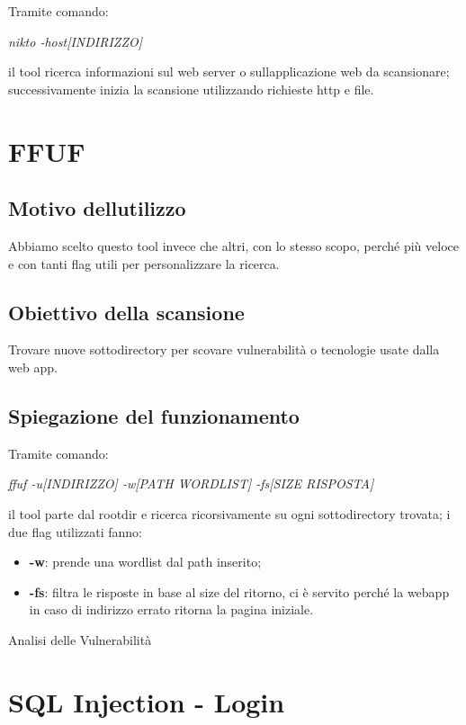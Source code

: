 Tramite comando:

\emph{nikto -host{[}INDIRIZZO{]}}

il tool ricerca informazioni sul web server o
sull\textquotesingle applicazione web da scansionare; successivamente
inizia la scansione utilizzando richieste http e file.

\section{FFUF}\label{ffuf}

\subsection{Motivo
dell\textquotesingle utilizzo}\label{motivo-dellutilizzo-6}

Abbiamo scelto questo tool invece che altri, con lo stesso scopo, perché
più veloce e con tanti flag utili per personalizzare la ricerca.

\subsection{Obiettivo della
scansione}\label{obiettivo-della-scansione-6}

Trovare nuove sottodirectory per scovare vulnerabilità o tecnologie
usate dalla web app.

\subsection{Spiegazione del
funzionamento}\label{spiegazione-del-funzionamento-6}

Tramite comando:

\emph{ffuf -u{[}INDIRIZZO{]} -w{[}PATH WORDLIST{]} -fs{[}SIZE
RISPOSTA{]}}

il tool parte dal rootdir e ricerca ricorsivamente su ogni
sottodirectory trovata; i due flag utilizzati fanno:

\begin{itemize}
\item
  \textbf{-w}: prende una wordlist dal path inserito;
\item
  \textbf{-fs}: filtra le risposte in base al size del ritorno, ci è
  servito perché la webapp in caso di indirizzo errato ritorna la pagina
  iniziale.
\end{itemize}

Analisi delle Vulnerabilità

\section{SQL Injection - Login}\label{sql-injection---login}

